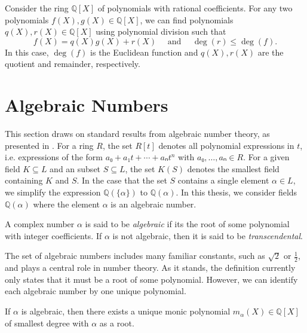 \begin{example}
  Consider the ring $ℚ[X]$ of polynomials with rational coefficients.
  For any two polynomials $f(X), g(X) ∈ ℚ[X]$,
  we can find polynomials $q(X), r(X) ∈ ℚ[X]$
  using polynomial division such that
  \[
    f(X) = q(X) g(X) + r(X)
    \quad
    \text{ and }
    \quad
    \deg(r) ≤ \deg(f).
  \]
  In this case, $\deg(f)$ is the Euclidean function and $q(X), r(X)$ are
  the quotient and remainder, respectively.
\end{example}

\section{Algebraic Numbers}

This section draws on standard results from algebraic number theory, as presented in \cite{Dummit04}.
For a ring $R$,
the set $R[t]$ denotes all polynomial expressions in $t$,
i.e. expressions of the form $a₀ + a₁ t + ⋯ + aₙ t^n$ with $a₀, …, aₙ ∈ R$.
For a given field $K ⊆ L$ and an subset $S ⊆ L$,
the set $K(S)$ denotes the smallest field containing $K$ and $S$.
In the case that the set $S$ contains a single element $α ∈ L$, we simplify the
expression $ℚ(\{α\})$ to $ℚ(α)$.
In this thesis, we consider fields $ℚ(α)$ where the element $α$ is an algebraic number.

\begin{definition}
  A complex number $α$ is said to be \emph{algebraic} if its the root of some polynomial
  with integer coefficients.
  If $α$ is not algebraic, then it is said to be \emph{transcendental}.
\end{definition}

The set of algebraic numbers includes many familiar constants, such as $\sqrt{2}$ or $\frac{1}{2}$,
and plays a central role in number theory.
As it stands, the definition currently only states that it must be a root of some polynomial.
However, we can identify each algebraic number by one unique polynomial.

\begin{lemma}
  If $α$ is algebraic, then there exists a unique monic polynomial $m_α(X) ∈ ℚ[X]$
  of smallest degree with $α$ as a root.
\end{lemma}

